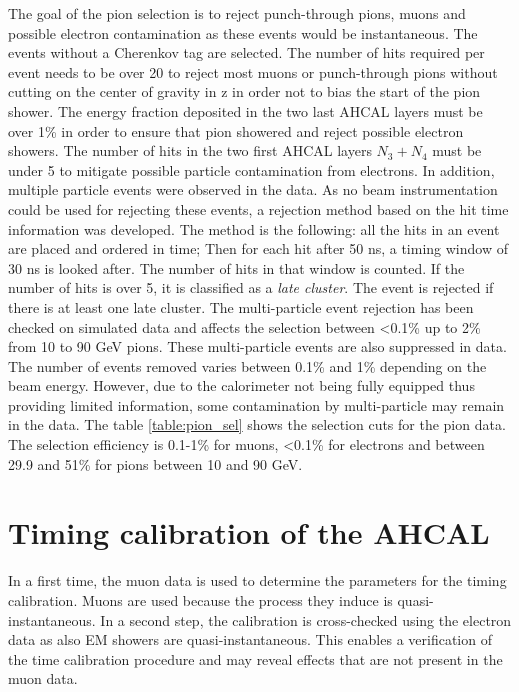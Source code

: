 \documentclass{JINST}
\begin{document}
The goal of the pion selection is to reject punch-through pions, muons and possible electron contamination as these events would be instantaneous. The events without a Cherenkov tag are selected. The number of hits required per event needs to be over 20 to reject most muons or punch-through pions without cutting on the center of gravity in z in order not to bias the start of the pion shower. The energy fraction deposited in the two last AHCAL layers must be over 1\% in order to ensure that pion showered and reject possible electron showers. The number of hits in the two first AHCAL layers $N_3+N_4$ must be under 5 to mitigate possible particle contamination from electrons. In addition, multiple particle events were observed in the data. As no beam instrumentation could be used for rejecting these events, a rejection method based on the hit time information was developed. The method is the following: all the hits in an event are placed and ordered in time; Then for each hit after 50 ns, a timing window of 30 ns is looked after. The number of hits in that window is counted. If the number of hits is over 5, it is classified as a \textit{late cluster}. The event is rejected if there is at least one late cluster. The multi-particle event rejection has been checked on simulated data and affects the selection between <0.1\% up to 2\% from 10 to 90 GeV pions. These multi-particle events are also suppressed in data. The number of events removed varies between 0.1\% and 1\% depending on the beam energy. However, due to the calorimeter not being fully equipped thus providing limited information, some contamination by multi-particle may remain in the data. The table \ref{table:pion_sel} shows the selection cuts for the pion data. The selection efficiency is 0.1-1\% for muons, <0.1\% for electrons and between 29.9 and 51\% for pions between 10 and 90 GeV.

\section{Timing calibration of the AHCAL}

In a first time, the muon data is used to determine the parameters for the timing calibration. Muons are used because the process they induce is quasi-instantaneous. In a second step, the calibration is cross-checked using the electron data as also EM showers are quasi-instantaneous. This enables a verification of the time calibration procedure and may reveal effects that are not present in the muon data.
\end{document}
